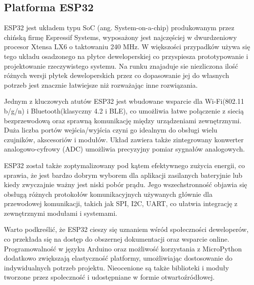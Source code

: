 \documentclass[12pt,twoside]{article}
\begin{document}
\subsection{Platforma ESP32}
{ESP32 jest układem typu SoC (ang. System-on-a-chip) produkowanym przez chińską firmę Espressif Systems, 
wyposażony jest najczęściej w dwurdzeniowy procesor Xtensa LX6 o taktowaniu 240 MHz. W większości przypadków używa się
tego układu osadzonego na płytce deweloperskiej co przyspiesza prototypowanie i projektowanie rzeczywistego 
systemu. Na runku znajaduje sie niezliczona ilość różnych wersji płytek deweloperskich przez co dopasowanie
jej do własnych potrzeb jest znacznie łatwiejsze niż rozważając inne rozwiązania.

Jednym z kluczowych atutów ESP32 jest wbudowane wsparcie dla Wi-Fi(802.11 b/g/n) i Bluetooth(klasyczny 4.2 i BLE),
 co umożliwia łatwe połączenie z siecią bezprzewodową oraz sprawną komunikację między urządzeniami zewnętrznymi.
 Duża liczba portów wejścia/wyjścia czyni go idealnym do obsługi wielu czujników, akscesoriów i modułów. Układ zawiera także 
zintegrowany konwerter analogowo-cyfrowy (ADC) umożliwia precyzyjny pomiar sygnałów analogowych.

ESP32 został także zoptymalizowany pod kątem efektywnego zużycia energii, co sprawia, że jest bardzo dobrym
 wyborem dla aplikacji zasilanych bateryjnie lub kiedy zwyczajnie ważny jest niski pobór prądu. Jego wszechstronność objawia
się obsługą różnych protokołów komunikacyjnych używanych głównie dla przewodowej komunikacji, 
takich jak SPI, I2C, UART, co ułatwia integrację z zewnętrznymi modułami i systemami.

Warto podkreślić, że ESP32 cieszy się uznaniem wśród społeczności deweloperów, co przekłada się na dostęp
 do obszernej dokumentacji oraz wsparcie online. Programowalność w języku Arduino oraz możliwość korzystania 
 z MicroPython dodatkowo zwiększają elastyczność platformy, umożliwiając dostosowanie do indywidualnych potrzeb projektu.
 Nieocenione są także biblioteki i moduły tworzone przez społeczność i udostępniane w formie otwartoźródłowej.}
\end{document}
